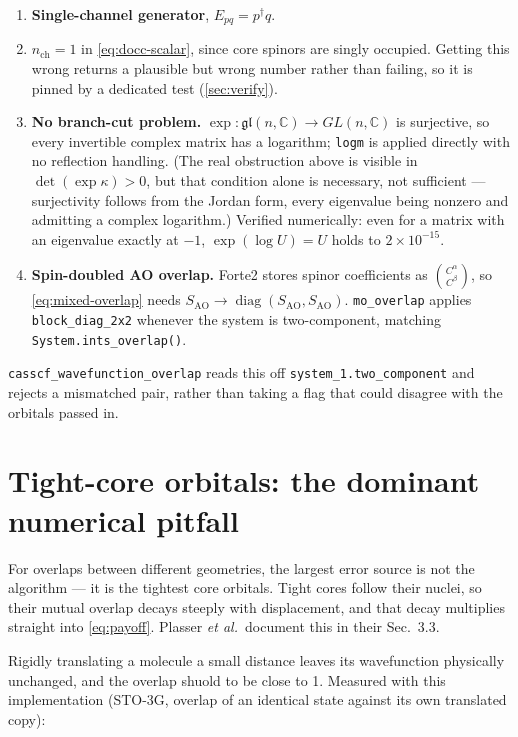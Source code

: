 \documentclass[aip,jcp,preprint]{revtex4-1}
\newcommand{\diag}{\operatorname{diag}}
\begin{document}
\begin{enumerate}
\item \textbf{Single-channel generator}, $E_{pq}=p^\dagger q$.
\item \textbf{$n_\mathrm{ch}=1$} in \cref{eq:docc-scalar}, since core
spinors are singly occupied. Getting this wrong returns a plausible but wrong
number rather than failing, so it is pinned by a dedicated test
(\cref{sec:verify}).
\item \textbf{No branch-cut problem.} $\exp\colon\mathfrak{gl}(n,\mathbb C)
\to GL(n,\mathbb C)$ is surjective, so every invertible complex matrix has a
logarithm; \texttt{logm} is applied directly with no reflection handling. (The
real obstruction above is visible in $\det(\exp\kappa)>0$, but that condition
alone is necessary, not sufficient --- surjectivity follows from the Jordan
form, every eigenvalue being nonzero and admitting a complex logarithm.)
Verified numerically: even for a matrix with an eigenvalue exactly at $-1$,
$\exp(\log U)=U$ holds to $2\times10^{-15}$.
\item \textbf{Spin-doubled AO overlap.} Forte2 stores spinor coefficients as
$\binom{C^\alpha}{C^\beta}$, so \cref{eq:mixed-overlap} needs
$S_\mathrm{AO}\to\diag(S_\mathrm{AO},S_\mathrm{AO})$. \texttt{mo\_overlap}
applies \texttt{block\_diag\_2x2} whenever the system is two-component,
matching \texttt{System.ints\_overlap()}.
\end{enumerate}

\texttt{casscf\_wavefunction\_overlap} reads this off
\texttt{system\_1.two\_component} and rejects a mismatched pair, rather than
taking a flag that could disagree with the orbitals passed in.

\section{Tight-core orbitals: the dominant numerical pitfall}
\label{sec:cores}

For overlaps between different geometries, the largest error source is not the
algorithm --- it is the tightest core orbitals. Tight cores follow their nuclei, so
their mutual overlap decays steeply with displacement, and that decay
multiplies straight into \cref{eq:payoff}. Plasser \emph{et al.}\ document this
in their Sec.~3.3.

Rigidly translating a molecule a small distance leaves its wavefunction physically unchanged,
and the overlap shuold to be close to 1. Measured with this implementation (STO-3G,
overlap of an identical state against its own translated copy):
\end{document}
